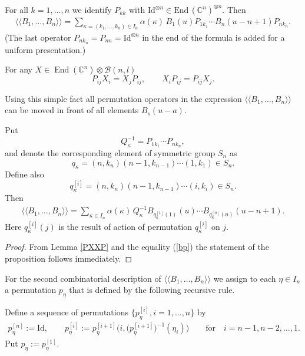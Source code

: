 \documentclass[pdftex]{sigma}
\newcommand{\CC}{\mathbb C}    %
\newcommand{\B}{\mathcal B}
\begin{document}
For all $k=1,\dots, n$ we identify $P_{kk}$ with $\text{Id}^{\otimes n}\in \text{End}\, (\CC^n)^{\otimes n}$. Then
\begin{gather}\label{bp}
\langle \langle
B_1,\dots, B_n
\rangle \rangle =
 \sum _{\kappa=(k_1,\dots, k_n) \in I_n} \alpha(\kappa)\,B_1(u) P_{1k_1}
\cdots
B_{n}(u-n+1) P_{nk_n}.
\end{gather}
(The last operator $P_{n k_n}=P_{nn}=\text{Id}^{\otimes n}$ in the end of the formula  is  added  for a uniform presentation.)

\begin{lemma}\label{PXXP} For any $X\in \operatorname{End}( \CC^n) \otimes\B(n,l)$
\[
P_{ij}X_i=X_jP_{ij},
\qquad
X_iP_{ij}=P_{ij}X_j.
\]
\end{lemma}
Using this simple fact   all permutation operators  in the expression
$\langle \langle B_1,\dots, B_n\rangle \rangle $  can be moved in front of all elements $B_s(u-a)$.


\begin{proposition}\label{QA}
 Put
 \[
 Q^{-1}_{\kappa}=P_{1 k_1}\cdots P_{n k_n},
 \]
and denote the corresponding element of symmetric group $S_n$ as
\[
q_{\kappa}=(n,k_n)(n-1,k_{n-1})\cdots (1,k_1)\in S_n.
\]
Define also
\[
q_{\kappa}^{[i]}=(n,k_n)(n-1,k_{n-1})\cdots (i,k_i)\in S_n.
\]
Then
\begin{gather}\label{q2}
\langle \langle B_1,\dots, B_n\rangle \rangle
=\sum_{ \kappa \in I_n }\alpha{( \kappa)}\,Q^{-1}_{\kappa}B_{q_{\kappa}^{[1]}(1)}(u)\cdots B_{q_{\kappa}^{[n]}(n)}(u-n+1).
\end{gather}
Here $q_{\kappa}^{[i]}(j)$ is the result of action of permutation $q_{\kappa}^{[i]}$ on $j$.
\end{proposition}

\begin{proof}
From Lemma \ref{PXXP}  and the equality (\ref{bp}) the statement of the proposition  follows imme\-dia\-te\-ly.
\end{proof}


For the second  combinatorial description of $\langle \langle B_1,\dots, B_n\rangle \rangle $ we assign to  each $\eta\in I_n$ a permutation
 $p_\eta$ that is def\/ined by the following recursive rule.

  Def\/ine a sequence of permutations $\{p^{[i]}_\eta, i=1,\dots, n\}$ by
  \begin{gather*}%
    p^{[n]}_\eta :=\text{Id},\qquad
       p^{[i]}_\eta :=
       p^{[i+1]}_\eta \big(i,\big(p^{[i+1]}_\eta\big)^{-1}(\eta_i)\big)\qquad \text{for}\quad i=n-1, n-2,\dots, 1.
 \end{gather*}
Put $p_\eta:=p^{[1]}_\eta$.
\end{document}
